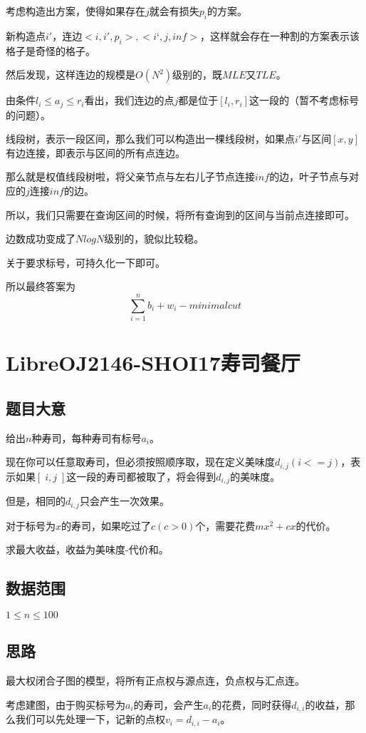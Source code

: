\documentclass{ctexart}
\numberwithin{equation}{section}
\begin{document}
\begin{flushleft}
  考虑构造出方案，使得如果存在$j$就会有损失$p_i$的方案。

  新构造点$i'$，连边$<i,i',p_i>,<i‘,j,inf>$，这样就会存在一种割的方案表示该格子是奇怪的格子。

  然后发现，这样连边的规模是$O(N^2)$级别的，既$MLE$又$TLE$。

  由条件$l_i\le a_j\le r_i$看出，我们连边的点$j$都是位于$[l_i,r_i]$这一段的（暂不考虑标号的问题）。

  线段树，表示一段区间，那么我们可以构造出一棵线段树，如果点$i'$与区间$[x,y]$有边连接，即表示与区间的所有点连边。

  那么就是权值线段树啦，将父亲节点与左右儿子节点连接$inf$的边，叶子节点与对应的$j$连接$inf$的边。

  所以，我们只需要在查询区间的时候，将所有查询到的区间与当前点连接即可。

  边数成功变成了$NlogN$级别的，貌似比较稳。

  关于要求标号，可持久化一下即可。

  所以最终答案为$$\sum_{i=1}^nb_i+w_i-minimalcut$$
  \newpage

  \section{LibreOJ2146-SHOI17寿司餐厅}
  \subsection{题目大意}
  给出$n$种寿司，每种寿司有标号$a_i$。

  现在你可以任意取寿司，但必须按照顺序取，现在定义美味度$d_{i,j}(i<=j)$，表示如果$[\;i,j\;]$这一段的寿司都被取了，将会得到$d_{i,j}$的美味度。

  但是，相同的$d_{i,j}$只会产生一次效果。

  对于标号为$x$的寿司，如果吃过了$c(c>0)$个，需要花费$mx^2+cx$的代价。

  求最大收益，收益为美味度-代价和。
  
  \subsection{数据范围}
  $1\le n \le 100$
  
  \subsection{思路}
  最大权闭合子图的模型，将所有正点权与源点连，负点权与汇点连。

  考虑建图，由于购买标号为$a_i$的寿司，会产生$a_i$的花费，同时获得$d_{i,i}$的收益，那么我们可以先处理一下，记新的点权$v_i=d_{i,i}-a_i$。


\end{flushleft}
\end{document}

